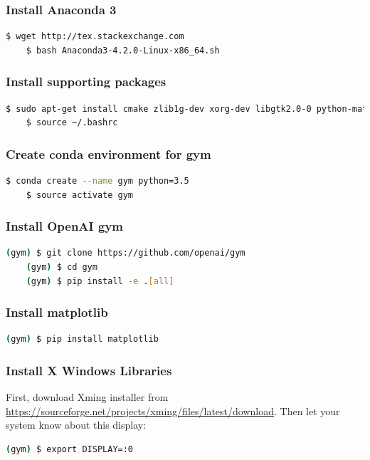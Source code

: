 \documentclass[11pt]{article}
\begin{document}
 \subsubsection*{Install Anaconda 3}
 \begin{lstlisting}[language=bash]
    $ wget http://tex.stackexchange.com
    $ bash Anaconda3-4.2.0-Linux-x86_64.sh
 \end{lstlisting}
 \subsubsection*{Install supporting packages}
 \begin{lstlisting}[language=bash]
    $ sudo apt-get install cmake zlib1g-dev xorg-dev libgtk2.0-0 python-matplotlib swig python-opengl
    $ source ~/.bashrc
 \end{lstlisting} 
 \subsubsection*{Create conda environment for gym}
  \begin{lstlisting}[language=bash]
    $ conda create --name gym python=3.5
    $ source activate gym
 \end{lstlisting} 
 \subsubsection*{Install OpenAI gym}
 \begin{lstlisting}[language=bash]
    (gym) $ git clone https://github.com/openai/gym
    (gym) $ cd gym
    (gym) $ pip install -e .[all]
 \end{lstlisting} 
 \subsubsection*{Install matplotlib}
 \begin{lstlisting}[language=bash]
    (gym) $ pip install matplotlib
 \end{lstlisting}
 \subsubsection*{Install X Windows Libraries}
 First, download Xming installer from \url{https://sourceforge.net/projects/xming/files/latest/download}. Then let your system know about this display:
 \begin{lstlisting}[language=bash]
    (gym) $ export DISPLAY=:0
 \end{lstlisting}     
\end{document}
